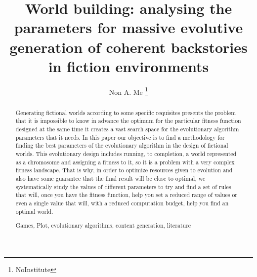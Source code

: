 \documentclass[runningheads,a4paper]{llncs}
\newcommand{\keywords}[1]{\par\addvspace\baselineskip
\noindent\keywordname\enspace\ignorespaces#1}
\begin{document}
\mainmatter  %

\title{World building: analysing the parameters for massive evolutive generation
  of coherent backstories in fiction environments} 


%
%
\author{Non A. Me%
\thanks{NoInstitute}}
%


%
%

\maketitle


\begin{abstract}
Generating fictional worlds according to some specific requisites
presents the problem that it is impossible to know in advance the optimum for the
particular fitness function designed at the same time it creates a
vast search space for the evolutionary algorithm parameters that it
needs. In this paper our objective is to find a methodology for finding the
best parameters of the evolutionary algorithm in the design of
fictional worlds. This evolutionary design includes running, to
completion, a world represented as a chromosome and assigning a fitness to it, so it is a problem
with a very complex fitness landscape. That is why, in order to
optimize resources given to evolution and also have some guarantee
that the final result will be close to optimal, we systematically
study the values of different parameters to try and find a set of
rules that will, once you have the fitness function, help you set a
reduced range of values or even a single value that will, with a
reduced computation budget, help you find an optimal world.

\keywords{Games, Plot, evolutionary algorithms, content generation, literature}
\end{abstract}
\end{document}
